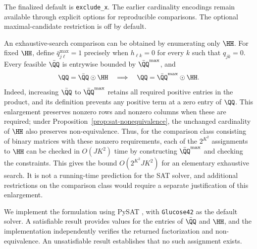 The finalized default is \texttt{exclude\_x}. The earlier cardinality
encodings remain available through explicit options for reproducible
comparisons. The optional maximal-candidate restriction is off by default.

An exhaustive-search comparison can be obtained by enumerating only
$\HH$. For fixed $\HH$, define $\bar q^{\max}_{j\ell}=1$ precisely when
$h_{\ell k}=0$ for every $k$ such that $q_{jk}=0$.
Every feasible $\bar{\QQ}$ is entrywise bounded by
$\bar{\QQ}^{\max}$, and
\[
\QQ=\bar{\QQ}\odot\HH
\quad\Longrightarrow\quad
\QQ=\bar{\QQ}^{\max}\odot\HH.
\]
Indeed, increasing $\bar{\QQ}$ to $\bar{\QQ}^{\max}$ retains all
required positive entries in the product, and its definition prevents
any positive term at a zero entry of $\QQ$. This enlargement preserves
nonzero rows and nonzero columns when these are required; under
Proposition~\ref{prop:sat-nonequivalence}, the unchanged cardinality
of $\HH$ also preserves non-equivalence. Thus, for the comparison
class consisting of binary matrices with these nonzero requirements,
each of the $2^{K^2}$ assignments to $\HH$ can be checked in
$O(JK^2)$ time by constructing $\bar{\QQ}^{\max}$ and checking the
constraints. This gives the bound $O(2^{K^2}JK^2)$ for an elementary
exhaustive search. It is not a running-time prediction for the SAT
solver, and additional restrictions on the comparison class would
require a separate justification of this enlargement.

We implement the formulation using PySAT \citep{ignatiev2018pysat},
with \texttt{Glucose42} as the default solver. A satisfiable result
provides values for the entries of $\bar{\QQ}$ and $\HH$, and the
implementation independently verifies the returned factorization
and non-equivalence. An unsatisfiable result establishes that no such
assignment exists.
